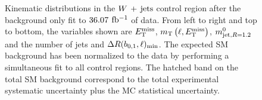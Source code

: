 \begin{figure}[!h]
  \caption[Kinematic distributions in the $\Wjets$ control region after the background only fit to $\intlumi$ $\ifb$ of data]{Kinematic distributions in the $\Wjets$ control region after the background only fit to $\intlumi$ $\ifb$ of data. From left to right and top to bottom, the variables shown are $E_{\mathrm{T}}^{\mathrm{miss}}$, $m_{\mathrm{T}}\left(\ell,E_{\mathrm{T}}^{\mathrm{miss}}\right)$, $m^{0}_{\mathrm{jet,}R=1.2}$ and the number of jets and $\Delta R(b_{0,1},\ell)_{\mathrm{min}}$. The expected SM background has been normalized to the data by performing a simultaneous fit to all control regions.  The hatched band on the total SM background correspond to the total experimental systematic uncertainty plus the MC statistical uncertainty.}
  \label{fig:CRWpts}
\end{figure}



%  


